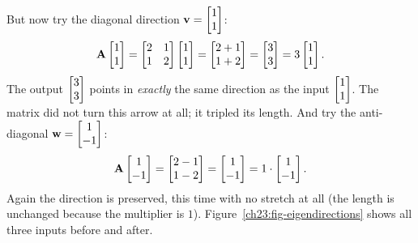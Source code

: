 But now try the diagonal direction $\mathbf{v}=\begin{bmatrix}1\\1\end{bmatrix}$:
\[
  \mathbf{A}\begin{bmatrix}1\\1\end{bmatrix}
  =\begin{bmatrix} 2 & 1 \\ 1 & 2 \end{bmatrix}\begin{bmatrix}1\\1\end{bmatrix}
  =\begin{bmatrix}2+1\\1+2\end{bmatrix}=\begin{bmatrix}3\\3\end{bmatrix}=3\begin{bmatrix}1\\1\end{bmatrix}.
\]
The output $\begin{bmatrix}3\\3\end{bmatrix}$ points in \emph{exactly} the same
direction as the input $\begin{bmatrix}1\\1\end{bmatrix}$. The matrix did not turn this arrow at all;
it tripled its length. And try the anti-diagonal $\mathbf{w}=\begin{bmatrix}1\\-1\end{bmatrix}$:
\[
  \mathbf{A}\begin{bmatrix}1\\-1\end{bmatrix}
  =\begin{bmatrix}2-1\\1-2\end{bmatrix}=\begin{bmatrix}1\\-1\end{bmatrix}=1\cdot\begin{bmatrix}1\\-1\end{bmatrix}.
\]
Again the direction is preserved, this time with no stretch at all (the
length is unchanged because the multiplier is $1$).
Figure~\ref{ch23:fig-eigendirections} shows all three inputs before and after.

